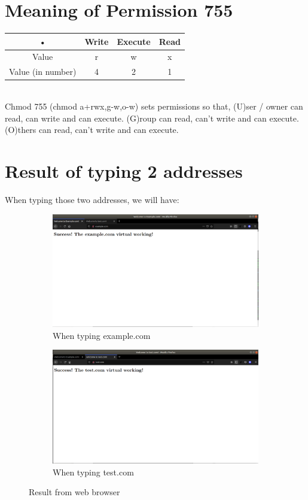 \documentclass[11pt,a4paper]{report}
\begin{document}
	\section{Meaning of Permission 755}
	\begin{tabular}{|c|c|c|c|}
	\hline 
	• & Write & Execute & Read \\ 
	\hline 
	Value & r & w & x \\ 
	\hline 
	Value (in number) & 4 & 2 & 1 \\ 
	\hline 
	\end{tabular} 
	\\Chmod 755 (chmod a+rwx,g-w,o-w) sets permissions so that, (U)ser / owner can read, can write and can execute. (G)roup can read, can't write and can execute. (O)thers can read, can't write and can execute.
	\section{Result of typing 2 addresses}
	When typing those two addresses, we will have:
	\begin{figure}[h!]
		\centering
  		\begin{subfigure}[b]{0.4\linewidth}
    		\includegraphics[width=\linewidth]{example-res.png}
    		\caption{When typing example.com}
  		\end{subfigure}
  		\begin{subfigure}[b]{0.4\linewidth}
    		\includegraphics[width=\linewidth]{test-res.png}
    		\caption{When typing test.com}
  		\end{subfigure}
  		\caption{Result from web browser}
  		\label{fig:webbrowserres}
	\end{figure}
\end{document}
